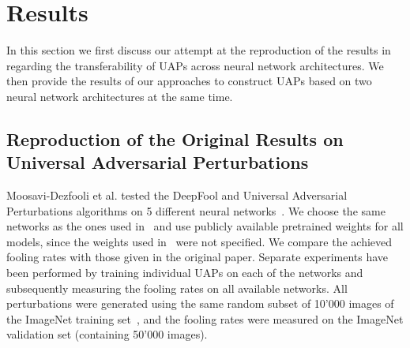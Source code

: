 \documentclass[runningheads]{llncs}
\begin{document}
\section{Results}\label{sec:Results}
In this section we first discuss our attempt at the reproduction of the results in~\cite{moosavidezfooli_universal_2017} regarding the transferability of UAPs across neural network architectures. We then provide the results of our approaches to construct UAPs based on two neural network architectures at the same time.

\subsection{Reproduction of the Original Results on Universal Adversarial Perturbations}
Moosavi-Dezfooli et al. tested the DeepFool and Universal Adversarial Perturbations algorithms on 5 different neural networks~\cite{moosavidezfooli_universal_2017}. 
We choose the same networks as the ones used in~\cite{moosavidezfooli_universal_2017} and use publicly available pretrained weights for all models, since the weights used in~\cite{moosavidezfooli_universal_2017} were not specified. We compare the achieved fooling rates with those given in the original paper. Separate experiments have been performed by training individual UAPs on each of the networks and subsequently measuring the fooling rates on all available networks. All perturbations were generated using the same random subset of 10'000 images of the ImageNet training set~\cite{imagenet_cvpr09}, and the fooling rates were measured on the ImageNet validation set (containing 50'000 images).
\end{document}
